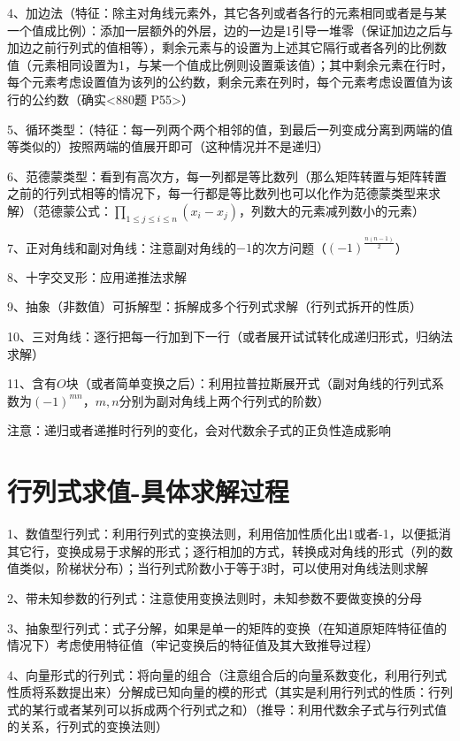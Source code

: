 4、加边法（特征：除主对角线元素外，其它各列或者各行的元素相同或者是与某一个值成比例）：添加一层额外的外层，边的一边是1引导一堆零（保证加边之后与加边之前行列式的值相等），剩余元素与的设置为上述其它隔行或者各列的比例数值（元素相同设置为1，与某一个值成比例则设置乘该值）；其中剩余元素在行时，每个元素考虑设置值为该列的公约数，剩余元素在列时，每个元素考虑设置值为该行的公约数（确实<880题 P55>）

5、循环类型：（特征：每一列两个两个相邻的值，到最后一列变成分离到两端的值等类似的）按照两端的值展开即可（这种情况并不是递归）

6、范德蒙类型：看到有高次方，每一列都是等比数列（那么矩阵转置与矩阵转置之前的行列式相等的情况下，每一行都是等比数列也可以化作为范德蒙类型来求解）（范德蒙公式：$\prod_{1\le j \le i \le n}(x_i-x_j)$，列数大的元素减列数小的元素）

7、正对角线和副对角线：注意副对角线的$-1$的次方问题（$(-1)^{\frac {n(n-1)}{2}}$）

8、十字交叉形：应用递推法求解

9、抽象（非数值）可拆解型：拆解成多个行列式求解（行列式拆开的性质）

10、三对角线：逐行把每一行加到下一行（或者展开试试转化成递归形式，归纳法求解）

11、含有$O$块（或者简单变换之后）：利用拉普拉斯展开式（副对角线的行列式系数为$(-1)^{mn}$，$m,n$分别为副对角线上两个行列式的阶数）

注意：递归或者递推时行列的变化，会对代数余子式的正负性造成影响

\section{行列式求值-具体求解过程}

1、数值型行列式：利用行列式的变换法则，利用倍加性质化出1或者-1，以便抵消其它行，变换成易于求解的形式；逐行相加的方式，转换成对角线的形式（列的数值类似，阶梯状分布）；当行列式阶数小于等于3时，可以使用对角线法则求解

2、带未知参数的行列式：注意使用变换法则时，未知参数不要做变换的分母

3、抽象型行列式：式子分解，如果是单一的矩阵的变换（在知道原矩阵特征值的情况下）考虑使用特征值（牢记变换后的特征值及其大致推导过程）

4、向量形式的行列式：将向量的组合（注意组合后的向量系数变化，利用行列式性质将系数提出来）分解成已知向量的模的形式（其实是利用行列式的性质：行列式的某行或者某列可以拆成两个行列式之和）（推导：利用代数余子式与行列式值的关系，行列式的变换法则）

